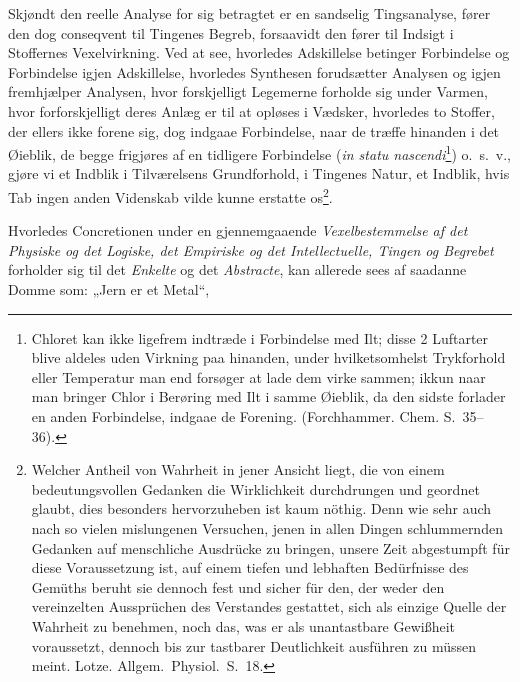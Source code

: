 \documentclass[12pt,a4paper]{book}
\begin{document}
Skjøndt den reelle Analyse for sig betragtet er en
sandselig Tingsanalyse, fører den dog conseqvent til Tingenes
Begreb, forsaavidt den fører til Indsigt i Stoffernes
\setcounter{footnote}{0}
Vexelvirkning. Ved at see, hvorledes Adskillelse betinger Forbindelse
og Forbindelse igjen Adskillelse, hvorledes Synthesen
forudsætter Analysen og igjen fremhjælper Analysen, hvor
forskjelligt Legemerne forholde sig under Varmen, hvor
forforskjelligt deres Anlæg er til at opløses i Vædsker, hvorledes
to Stoffer, der ellers ikke forene sig, dog indgaae Forbindelse,
naar de træffe hinanden i det Øieblik, de begge frigjøres af
en tidligere Forbindelse (\textit{in statu
nascendi}\footnote{Chloret kan ikke ligefrem indtræde i Forbindelse
med Ilt; disse
2 Luftarter blive aldeles uden Virkning paa hinanden, under
hvilketsomhelst Trykforhold eller Temperatur man end forsøger
at lade dem virke sammen; ikkun naar man bringer Chlor i Berøring
med Ilt i samme Øieblik, da den sidste forlader en anden
Forbindelse, indgaae de Forening. (Forchhammer. Chem. S.\
35--36).}) o.\ s.\ v., gjøre
vi et Indblik i Tilværelsens Grundforhold, i Tingenes Natur,
et Indblik, hvis Tab ingen anden Videnskab vilde kunne
erstatte os\footnote{Welcher Antheil von Wahrheit in jener Ansicht
liegt, die von
einem bedeutungsvollen Gedanken die Wirklichkeit durchdrungen
und geordnet glaubt, dies besonders hervorzuheben ist kaum nöthig.
Denn wie sehr auch nach so vielen mislungenen Versuchen, jenen
in allen Dingen schlummernden Gedanken auf menschliche
Ausdrücke zu bringen, unsere Zeit abgestumpft für diese Voraussetzung
ist, auf einem tiefen und lebhaften Bedürfnisse des Gemüths
beruht sie dennoch fest und sicher für den, der weder den vereinzelten
Aussprüchen des Verstandes gestattet, sich als einzige Quelle
der Wahrheit zu benehmen, noch das, was er als unantastbare
Gewißheit voraussetzt, dennoch bis zur tastbarer Deutlichkeit
ausführen zu müssen meint. Lotze. Allgem.\ Physiol.\ S.\ 18.}.

Hvorledes Concretionen under en gjennemgaaende
\emph{Vexelbestemmelse af det Physiske og det Logiske, det
Empiriske og det Intellectuelle, Tingen og Begrebet}
forholder sig til det \emph{Enkelte} og det \emph{Abstracte}, kan
allerede sees af saadanne Domme som: „Jern er et Metal“,
\end{document}
